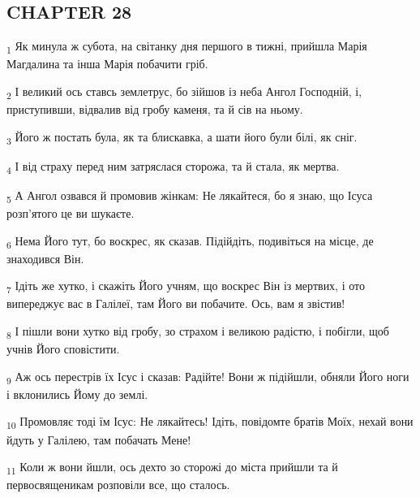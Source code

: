 \subsection{CHAPTER 28}
\begin{tcolorbox}
\textsubscript{1} Як минула ж субота, на світанку дня першого в тижні, прийшла Марія Магдалина та інша Марія побачити гріб.
\end{tcolorbox}
\begin{tcolorbox}
\textsubscript{2} І великий ось ставсь землетрус, бо зійшов із неба Ангол Господній, і, приступивши, відвалив від гробу каменя, та й сів на ньому.
\end{tcolorbox}
\begin{tcolorbox}
\textsubscript{3} Його ж постать була, як та блискавка, а шати його були білі, як сніг.
\end{tcolorbox}
\begin{tcolorbox}
\textsubscript{4} І від страху перед ним затряслася сторожа, та й стала, як мертва.
\end{tcolorbox}
\begin{tcolorbox}
\textsubscript{5} А Ангол озвався й промовив жінкам: Не лякайтеся, бо я знаю, що Ісуса розп'ятого це ви шукаєте.
\end{tcolorbox}
\begin{tcolorbox}
\textsubscript{6} Нема Його тут, бо воскрес, як сказав. Підійдіть, подивіться на місце, де знаходився Він.
\end{tcolorbox}
\begin{tcolorbox}
\textsubscript{7} Ідіть же хутко, і скажіть Його учням, що воскрес Він із мертвих, і ото випереджує вас в Галілеї, там Його ви побачите. Ось, вам я звістив!
\end{tcolorbox}
\begin{tcolorbox}
\textsubscript{8} І пішли вони хутко від гробу, зо страхом і великою радістю, і побігли, щоб учнів Його сповістити.
\end{tcolorbox}
\begin{tcolorbox}
\textsubscript{9} Аж ось перестрів їх Ісус і сказав: Радійте! Вони ж підійшли, обняли Його ноги і вклонились Йому до землі.
\end{tcolorbox}
\begin{tcolorbox}
\textsubscript{10} Промовляє тоді їм Ісус: Не лякайтесь! Ідіть, повідомте братів Моїх, нехай вони йдуть у Галілею, там побачать Мене!
\end{tcolorbox}
\begin{tcolorbox}
\textsubscript{11} Коли ж вони йшли, ось дехто зо сторожі до міста прийшли та й первосвященикам розповіли все, що сталось.
\end{tcolorbox}
